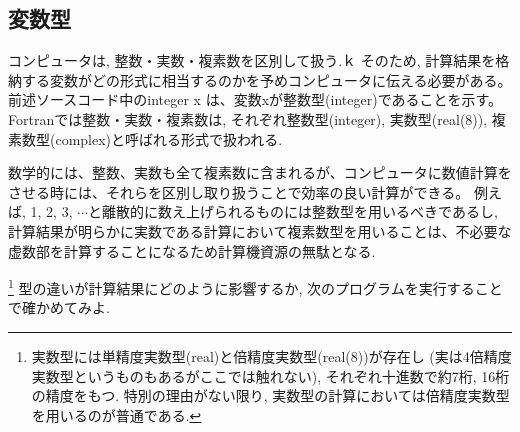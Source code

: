 \documentclass[a4j]{jsarticle}
\begin{document}

\subsection{変数型}
コンピュータは, 整数・実数・複素数を区別して扱う.ｋ
そのため, 計算結果を格納する変数がどの形式に相当するのかを予めコンピュータに伝える必要がある。
前述ソースコード中の{\ttfamily integer x} は、変数{\ttfamily x}が整数型(integer)であることを示す。
Fortranでは整数・実数・複素数は, それぞれ整数型(integer), 実数型(real(8)), 複素数型(complex)と呼ばれる形式で扱われる.

数学的には、整数、実数も全て複素数に含まれるが、コンピュータに数値計算をさせる時には、それらを区別し取り扱うことで効率の良い計算ができる。
例えば, 1, 2, 3, $\cdots$と離散的に数え上げられるものには整数型を用いるべきであるし, 
計算結果が明らかに実数である計算において複素数型を用いることは、不必要な虚数部を計算することになるため計算機資源の無駄となる. 

\footnote{実数型には単精度実数型(real)と倍精度実数型(real(8))が存在し
(実は4倍精度実数型というものもあるがここでは触れない), 
それぞれ十進数で約7桁, 16桁の精度をもつ. 
特別の理由がない限り, 実数型の計算においては倍精度実数型を用いるのが普通である. 
}
型の違いが計算結果にどのように影響するか, 次のプログラムを実行することで確かめてみよ. 

\end{document}
